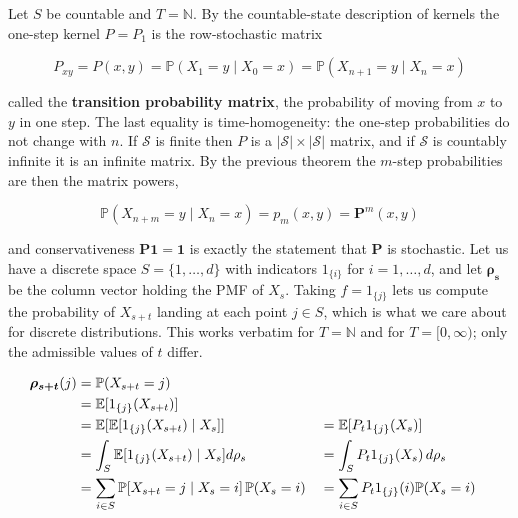 	\begin{example}
		\label{def:transition-matrix}
		Let $S$ be countable and $T = \mathbb{N}$. By the countable-state description of kernels the one-step kernel $P = P_1$ is the row-stochastic matrix

			\begin{equation}
				P_{x y} = P(x, y) = \mathbb{P}(X_1 = y \mid X_0 = x) = \mathbb{P}(X_{n+1} = y \mid X_n = x)
			\end{equation}

		called the \textbf{transition probability matrix}, the probability of moving from $x$ to $y$ in one step. The last equality is time-homogeneity: the one-step probabilities do not change with $n$. If $\mathcal{S}$ is finite then $P$ is a $|\mathcal{S}| \times |\mathcal{S}|$ matrix, and if $\mathcal{S}$ is countably infinite it is an infinite matrix. By the previous theorem the $m$-step probabilities are then the matrix powers,

			\begin{equation}
				\mathbb{P}(X_{n + m} = y \mid X_n = x) = p_m(x, y) = \mathbf{P}^m (x, y)
			\end{equation}

		and conservativeness $\mathbf{P} \mathbf{1} = \mathbf{1}$ is exactly the statement that $\mathbf{P}$ is stochastic.
		\label{ex:transition-operator-as-a-matrix-in-discrete}
		Let us have a discrete space $S = \{1, \ldots, d\}$ with indicators $1_{\{i\}}$ for $i = 1, \ldots, d$, and let $\boldsymbol{\rho_s}$ be the column vector holding the PMF of $X_s$. Taking $f = 1_{\{j\}}$ lets us compute the probability of $X_{s + t}$ landing at each point $j \in S$, which is what we care about for discrete distributions. This works verbatim for $T = \mathbb{N}$ and for $T = [0, \infty)$; only the admissible values of $t$ differ. 

		\begin{align*}
			\boldsymbol{\rho_{s + t}} (j) & = \mathbb{P}( X_{s + t} = j) \\ 
			& = \operatorname{\mathbb{E}}[1_{\{j\}} (X_{s + t})] \\
			& = \operatorname{\mathbb{E}} [ \operatorname{\mathbb{E}}[ 1_{\{j\}} (X_{s + t}) \mid X_s] ] && = \operatorname{\mathbb{E}}[P_t 1_{\{j\}} (X_s)] \\
			& = \int_S \operatorname{\mathbb{E}}[ 1_{\{j\}} (X_{s + t}) \mid X_s] d\rho_s && = \int_S P_t 1_{\{j\}} (X_s) \,d \rho_s \\
			& = \sum_{i \in S} \mathbb{P}[ X_{s + t} = j \mid X_s = i] \, \mathbb{P} ( X_s = i) && = \sum_{i \in S} P_t 1_{\{j\}} (i) \mathbb{P}(X_s = i) 
		\end{align*}


\end{example}
